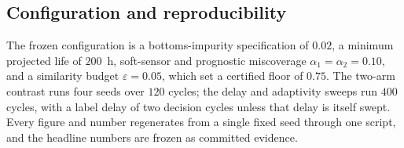 \subsection{Configuration and reproducibility}
The frozen configuration is a bottoms-impurity specification of $0.02$, a minimum projected life
of $200$~h, soft-sensor and prognostic miscoverage $\alpha_1=\alpha_2=0.10$, and a similarity
budget $\varepsilon=0.05$, which set a certified floor of $0.75$. The two-arm contrast runs four
seeds over $120$ cycles; the delay and adaptivity sweeps run $400$ cycles, with a label delay of
two decision cycles unless that delay is itself swept. Every figure and number regenerates from a
single fixed seed through one script, and the headline numbers are frozen as committed evidence.
